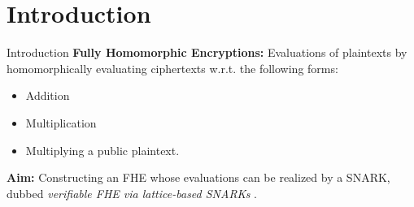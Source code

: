 \section{Introduction}
\begin{frame}{Introduction}
	\textbf{Fully Homomorphic Encryptions:} Evaluations of plaintexts by homomorphically evaluating ciphertexts w.r.t. the following forms:
	\begin{itemize}
		\item Addition
		\item Multiplication
		\item Multiplying a public plaintext.
	\end{itemize}
	
	\textbf{Aim:} 
	Constructing an FHE whose evaluations can be realized by a SNARK, dubbed \textit{verifiable FHE via lattice-based SNARKs} \cite{CIC:ABPS24}.
\end{frame}